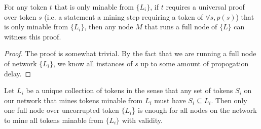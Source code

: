 \documentclass[12pt]{amsart}
\begin{document}
\begin{lem}
For any token $t$ that is only minable from $\{L_i\}$, if $t$ requires a universal proof over token $s$ (i.e. a statement a mining step requiring a token of $\forall s, p(s)$) that is only minable from $\{L_i\}$, then any node $M$ that runs a full node of $\{L\}$ can witness this proof.
\end{lem}
\begin{proof}
The proof is somewhat trivial. By the fact that we are running a full node of network $\{L_i\}$, we know all instances of $s$ up to some amount of propogation delay.
\end{proof}

\begin{cor}
Let $L_i$ be a unique collection of tokens in the sense that any set of tokens $S_i$ on our network that mines tokens minable from $L_i$ must have $S_i\subseteq L_i$. Then only one full node over uncorrupted token $\{L_i$\} is enough for all nodes on the network to mine all tokens minable from $\{L_i\}$ with validity.
\end{cor}
\end{document}

